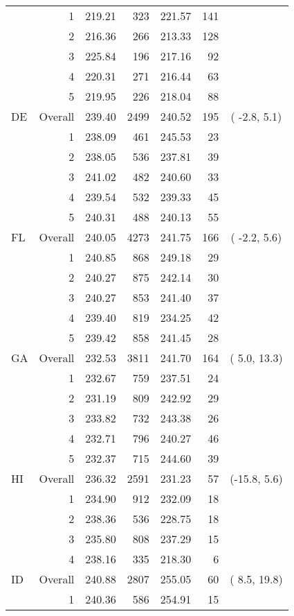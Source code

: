 \begin{longtable}{lrrr@{\extracolsep{.25cm}}rrc}
   & 1 & 219.21 & 323 & 221.57 & 141 &  \\ 
   & 2 & 216.36 & 266 & 213.33 & 128 &  \\ 
   & 3 & 225.84 & 196 & 217.16 &  92 &  \\ 
   & 4 & 220.31 & 271 & 216.44 &  63 &  \\ 
   & 5 & 219.95 & 226 & 218.04 &  88 &  \\ 
   \hline
DE & Overall & 239.40 & 2499 & 240.52 & 195 & ( -2.8,   5.1) \\ 
   & 1 & 238.09 & 461 & 245.53 &  23 &  \\ 
   & 2 & 238.05 & 536 & 237.81 &  39 &  \\ 
   & 3 & 241.02 & 482 & 240.60 &  33 &  \\ 
   & 4 & 239.54 & 532 & 239.33 &  45 &  \\ 
   & 5 & 240.31 & 488 & 240.13 &  55 &  \\ 
   \hline
FL & Overall & 240.05 & 4273 & 241.75 & 166 & ( -2.2,   5.6) \\ 
   & 1 & 240.85 & 868 & 249.18 &  29 &  \\ 
   & 2 & 240.27 & 875 & 242.14 &  30 &  \\ 
   & 3 & 240.27 & 853 & 241.40 &  37 &  \\ 
   & 4 & 239.40 & 819 & 234.25 &  42 &  \\ 
   & 5 & 239.42 & 858 & 241.45 &  28 &  \\ 
   \hline
GA & Overall & 232.53 & 3811 & 241.70 & 164 & (  5.0,  13.3) \\ 
   & 1 & 232.67 & 759 & 237.51 &  24 &  \\ 
   & 2 & 231.19 & 809 & 242.92 &  29 &  \\ 
   & 3 & 233.82 & 732 & 243.38 &  26 &  \\ 
   & 4 & 232.71 & 796 & 240.27 &  46 &  \\ 
   & 5 & 232.37 & 715 & 244.60 &  39 &  \\ 
   \hline
HI & Overall & 236.32 & 2591 & 231.23 &  57 & (-15.8,   5.6) \\ 
   & 1 & 234.90 & 912 & 232.09 &  18 &  \\ 
   & 2 & 238.36 & 536 & 228.75 &  18 &  \\ 
   & 3 & 235.80 & 808 & 237.29 &  15 &  \\ 
   & 4 & 238.16 & 335 & 218.30 &   6 &  \\ 
   \hline
ID & Overall & 240.88 & 2807 & 255.05 &  60 & (  8.5,  19.8) \\ 
   & 1 & 240.36 & 586 & 254.91 &  15 &  \\ 

\end{longtable}
